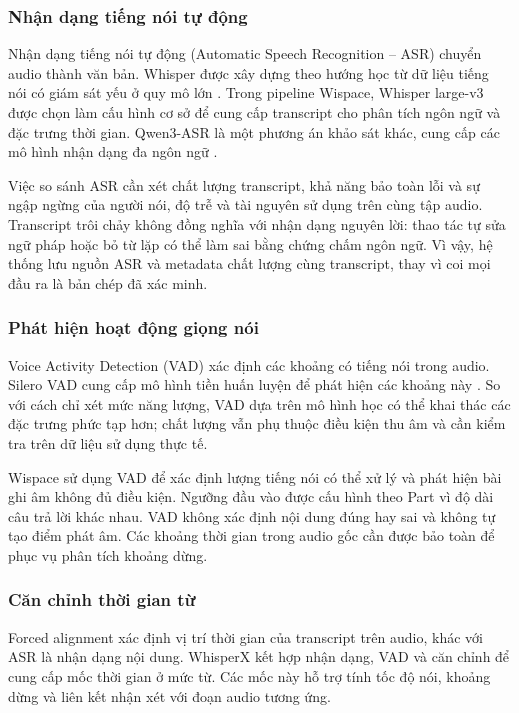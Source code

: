 \subsubsection{Nhận dạng tiếng nói tự động}

Nhận dạng tiếng nói tự động (Automatic Speech Recognition -- ASR) chuyển audio thành văn bản. Whisper được xây dựng theo hướng học từ dữ liệu tiếng nói có giám sát yếu ở quy mô lớn \parencite{ch3_whisper}. Trong pipeline Wispace, Whisper large-v3 được chọn làm cấu hình cơ sở để cung cấp transcript cho phân tích ngôn ngữ và đặc trưng thời gian. Qwen3-ASR là một phương án khảo sát khác, cung cấp các mô hình nhận dạng đa ngôn ngữ \parencite{ch3_qwen_asr}.

Việc so sánh ASR cần xét chất lượng transcript, khả năng bảo toàn lỗi và sự ngập ngừng của người nói, độ trễ và tài nguyên sử dụng trên cùng tập audio. Transcript trôi chảy không đồng nghĩa với nhận dạng nguyên lời: thao tác tự sửa ngữ pháp hoặc bỏ từ lặp có thể làm sai bằng chứng chấm ngôn ngữ. Vì vậy, hệ thống lưu nguồn ASR và metadata chất lượng cùng transcript, thay vì coi mọi đầu ra là bản chép đã xác minh.

\subsubsection{Phát hiện hoạt động giọng nói}

Voice Activity Detection (VAD) xác định các khoảng có tiếng nói trong audio. Silero VAD cung cấp mô hình tiền huấn luyện để phát hiện các khoảng này \parencite{ch3_silero}. So với cách chỉ xét mức năng lượng, VAD dựa trên mô hình học có thể khai thác các đặc trưng phức tạp hơn; chất lượng vẫn phụ thuộc điều kiện thu âm và cần kiểm tra trên dữ liệu sử dụng thực tế.

Wispace sử dụng VAD để xác định lượng tiếng nói có thể xử lý và phát hiện bài ghi âm không đủ điều kiện. Ngưỡng đầu vào được cấu hình theo Part vì độ dài câu trả lời khác nhau. VAD không xác định nội dung đúng hay sai và không tự tạo điểm phát âm. Các khoảng thời gian trong audio gốc cần được bảo toàn để phục vụ phân tích khoảng dừng.

\subsubsection{Căn chỉnh thời gian từ}

Forced alignment xác định vị trí thời gian của transcript trên audio, khác với ASR là nhận dạng nội dung. WhisperX kết hợp nhận dạng, VAD và căn chỉnh để cung cấp mốc thời gian ở mức từ. Các mốc này hỗ trợ tính tốc độ nói, khoảng dừng và liên kết nhận xét với đoạn audio tương ứng.

